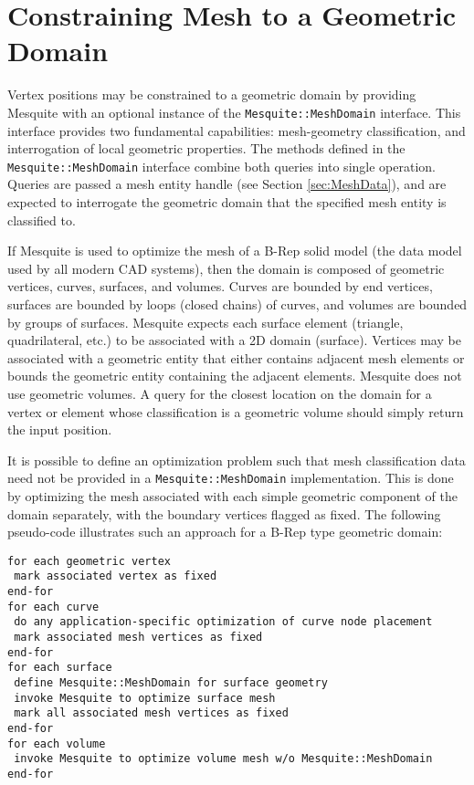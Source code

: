\chapter{Constraining Mesh to a Geometric Domain}
\label{sec:geom}

Vertex positions may be constrained to a geometric domain by providing Mesquite
with an optional instance of the \texttt{Mesquite::MeshDomain} interface.  This
interface provides two fundamental capabilities: mesh-geometry classification,
and interrogation of local geometric properties.  The methods defined in the 
\texttt{Mesquite::MeshDomain} interface combine both queries into single
operation.  Queries are passed a mesh entity handle (see Section \ref{sec:MeshData}),
and are expected to interrogate the geometric domain that the specified mesh
entity is classified to.

If Mesquite is used to optimize the mesh of a B-Rep solid model (the data model used by all modern CAD systems), then the domain is composed of geometric vertices,
curves, surfaces, and volumes.  Curves are bounded by end vertices, surfaces are
bounded by loops (closed chains) of curves, and volumes are bounded by groups of
surfaces.  Mesquite expects each surface element (triangle, quadrilateral, etc.)
to be associated with a 2D domain (surface).  Vertices may be associated with
a geometric entity that either contains adjacent mesh elements or bounds the
geometric entity containing the adjacent elements. Mesquite does not use 
geometric volumes.  A query for the closest location on the domain for a vertex 
or element whose classification is a geometric volume should simply return the 
input position.  

It is possible to define an optimization problem such that mesh classification
data need not be provided in a \texttt{Mesquite::MeshDomain} implementation. 
This is done by optimizing the mesh associated with each simple geometric
component of the domain separately, with the boundary vertices flagged as fixed.
The following pseudo-code illustrates such an approach for a B-Rep type geometric
domain:
\begin{verbatim}
for each geometric vertex
 mark associated vertex as fixed
end-for
for each curve
 do any application-specific optimization of curve node placement
 mark associated mesh vertices as fixed
end-for
for each surface
 define Mesquite::MeshDomain for surface geometry
 invoke Mesquite to optimize surface mesh
 mark all associated mesh vertices as fixed
end-for
for each volume
 invoke Mesquite to optimize volume mesh w/o Mesquite::MeshDomain
end-for
\end{verbatim}


